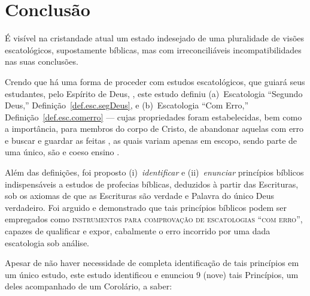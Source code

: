 
\section{Conclusão}

    É visível na cristandade atual um estado indesejado de uma pluralidade de visões escatológicos, supostamente  bíblicas,  mas
    com irreconciliáveis incompatibilidades nas suas conclusões.

    Crendo que há uma forma  de proceder com
    estudos escatológicos, que guiará seus estudantes, pelo Espírito de Deus, ,  este  estudo
    definiu   (a)~Escatologia   ``Segundo   Deus,''   Definição~\ref{def.esc.segDeus},   e   (b)~Escatologia    ``Com    Erro,''
    Definição~\ref{def.esc.comerro} --- cujas propriedades foram estabelecidas, bem como a importância, para membros do corpo de
    Cristo, de abandonar aquelas com erro e buscar e guardar as feitas , as quais variam apenas em  escopo,
    sendo parte de uma único, são e coeso ensino .

    Além das definições, foi proposto (i)~\emph{identificar} e (ii)~\emph{enunciar} princípios bíblicos indispensáveis a estudos
     de profecias bíblicas, deduzidos à partir  das
    Escrituras, sob os axiomas de que as Escrituras são verdade e Palavra do único Deus verdadeiro. Foi arguido e demonstrado
    que tais princípios bíblicos podem ser empregados como \textsc{instrumentos para comprovação de escatologias ``com erro''},
    capazes de qualificar e expor, cabalmente o erro incorrido por uma dada escatologia sob análise.

    Apesar de não haver necessidade de completa identificação de tais princípios em um único estudo, este estudo  identificou  e
    enunciou 9 (nove) tais Princípios, um deles acompanhado de um Corolário, a saber:


